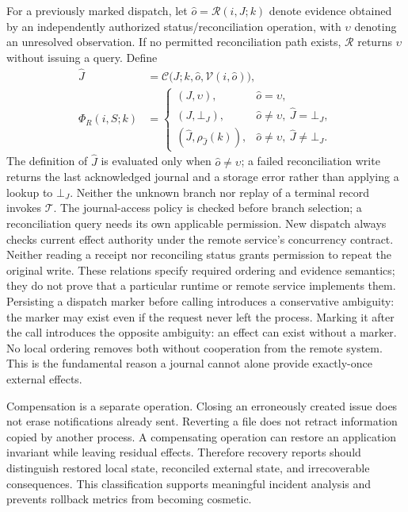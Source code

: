 For a previously marked dispatch, let $\widehat o=\mathcal R(i,J;k)$ denote evidence obtained by an independently authorized status/reconciliation operation, with $\upsilon$ denoting an unresolved observation. If no permitted reconciliation path exists, $\mathcal R$ returns $\upsilon$ without issuing a query. Define
\begin{equation}
\begin{aligned}
 \widehat J&=\mathcal C\bigl(J;k,\widehat o,
                         \mathcal V(i,\widehat o)\bigr),\\
 \Phi_R(i,S;k)&=
 \begin{cases}
  (J,\upsilon),&\widehat o=\upsilon,\\
  (J,\bot_J),&\widehat o\ne\upsilon,\ \widehat J=\bot_J,\\
  (\widehat J,\rho_{\widehat J}(k)),&\widehat o\ne\upsilon,\ \widehat J\ne\bot_J.
 \end{cases}
\end{aligned}
\label{eq:C20:reconciliation_transition}
\end{equation}
The definition of $\widehat J$ is evaluated only when $\widehat o\ne\upsilon$; a failed reconciliation write returns the last acknowledged journal and a storage error rather than applying a lookup to $\bot_J$. Neither the unknown branch nor replay of a terminal record invokes $\mathcal T$. The journal-access policy is checked before branch selection; a reconciliation query needs its own applicable permission. New dispatch always checks current effect authority under the remote service's concurrency contract. Neither reading a receipt nor reconciling status grants permission to repeat the original write. These relations specify required ordering and evidence semantics; they do not prove that a particular runtime or remote service implements them.
Persisting a dispatch marker before calling introduces a conservative ambiguity: the marker may exist even if the request never left the process. Marking it after the call introduces the opposite ambiguity: an effect can exist without a marker. No local ordering removes both without cooperation from the remote system. This is the fundamental reason a journal cannot alone provide exactly-once external effects.

Compensation is a separate operation. Closing an erroneously created issue does not erase notifications already sent. Reverting a file does not retract information copied by another process. A compensating operation can restore an application invariant while leaving residual effects. Therefore recovery reports should distinguish restored local state, reconciled external state, and irrecoverable consequences. This classification supports meaningful incident analysis and prevents rollback metrics from becoming cosmetic.

